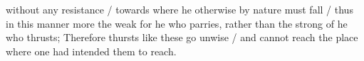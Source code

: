 \newpage


\newpage

%

without any resistance / towards where he otherwise by nature must
fall / thus in this manner more the weak for he who parries, rather
than the strong of he who thrusts; Therefore thursts like these go
unwise / and cannot reach the place where one had intended them to reach.



